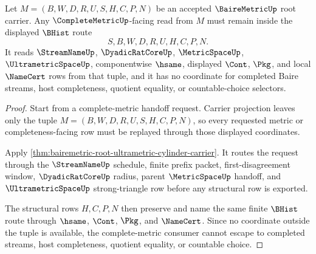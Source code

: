 \begin{theorem}
\label{thm:bairemetric-root-complete-metric-nonescape}
Let $M=(B,W,D,R,U,S,H,C,P,N)$ be an accepted $\BaireMetricUp$ root carrier. Any $\CompleteMetricUp$-facing read from $M$ must remain inside the displayed $\BHist$ route
$$
S,B,W,D,R,U,H,C,P,N .
$$
It reads $\StreamNameUp$, $\DyadicRatCoreUp$, $\MetricSpaceUp$, $\UltrametricSpaceUp$, componentwise $\hsame$, displayed $\Cont$, $\Pkg$, and local $\NameCert$ rows from that tuple, and it has no coordinate for completed Baire streams, host completeness, quotient equality, or countable-choice selectors.
\end{theorem}
\begin{proof}
Start from a complete-metric handoff request. Carrier projection leaves only the tuple $M=(B,W,D,R,U,S,H,C,P,N)$, so every requested metric or completeness-facing row must be replayed through those displayed coordinates.

Apply \autoref{thm:bairemetric-root-ultrametric-cylinder-carrier}. It routes the request through the $\StreamNameUp$ schedule, finite prefix packet, first-disagreement window, $\DyadicRatCoreUp$ radius, parent $\MetricSpaceUp$ handoff, and $\UltrametricSpaceUp$ strong-triangle row before any structural row is exported.

The structural rows $H,C,P,N$ then preserve and name the same finite $\BHist$ route through $\hsame$, $\Cont$, $\Pkg$, and $\NameCert$. Since no coordinate outside the tuple is available, the complete-metric consumer cannot escape to completed streams, host completeness, quotient equality, or countable choice.
\end{proof}

